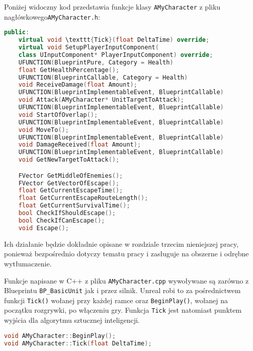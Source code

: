 \documentclass[12pt]{report}
\begin{document}
Poniżej widoczny kod przedstawia funkcje klasy \texttt{AMyCharacter} z pliku nagłówkowego\texttt{AMyCharacter.h}: 
\begin{lstlisting}[language=C++, backgroundcolor=\color{black!5}, basicstyle=\footnotesize, caption= Funkcje klasy AMyCharacter z pliku nagłówkowego \texttt{AMyCharacter.h}]
public:
	virtual void \texttt{Tick}(float DeltaTime) override;
	virtual void SetupPlayerInputComponent(
	class UInputComponent* PlayerInputComponent) override;
	UFUNCTION(BlueprintPure, Category = Health)
	float GetHealthPercentage();
	UFUNCTION(BlueprintCallable, Category = Health)
	void ReceiveDamage(float Amount);
	UFUNCTION(BlueprintImplementableEvent, BlueprintCallable)
	void Attack(AMyCharacter* UnitTargetToAttack);
	UFUNCTION(BlueprintImplementableEvent, BlueprintCallable)
	void StartOfOverlap();
	UFUNCTION(BlueprintImplementableEvent, BlueprintCallable)
	void MoveTo();
	UFUNCTION(BlueprintImplementableEvent, BlueprintCallable)
	void DamageReceived(float Amount);
	UFUNCTION(BlueprintImplementableEvent, BlueprintCallable)
	void GetNewTargetToAttack();

	FVector GetMiddleOfEnemies();
	FVector GetVectorOfEscape();
	float GetCurrentEscapeTime();
	float GetCurrentEscapeRouteLength();
	float GetCurrentSurvivalTime();
	bool CheckIfShouldEscape();
	bool CheckIfCanEscape();
	void Escape();
\end{lstlisting}
Ich działanie będzie dokładnie opisane w rozdziale trzecim nieniejszej pracy, ponieważ bezpośrednio dotyczy tematu pracy i zasługuje na obszerne i odrębne wytłumaczenie.

Funkcje napisane w C++ z pliku \texttt{AMyCharacter.cpp} wywoływane są zarówno z Blueprintu \texttt{BP\_BasicUnit} jak i przez silnik. Unreal robi to za pośrednictwem funkcji \texttt{\texttt{Tick}()} wołanej przy każdej ramce oraz \texttt{BeginPlay()}, wołanej na początku rozgrywki, po włączeniu gry. Funkcja \texttt{Tick} jest natomiast punktem wyjścia dla algorytmu sztucznej inteligencji. 
\begin{lstlisting}[language=C++, backgroundcolor=\color{black!5}, basicstyle=\footnotesize, caption= Funkcje wołane przez silnik w pliku \texttt{AMyCharacter.h}]
void AMyCharacter::BeginPlay();
void AMyCharacter::Tick(float DeltaTime);
\end{lstlisting}
\end{document}
